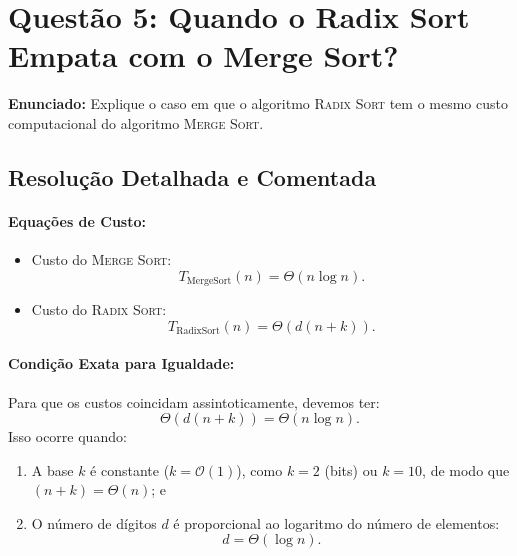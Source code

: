 \documentclass[11pt,a4paper]{article}
\begin{document}
\section*{Questão 5: Quando o Radix Sort Empata com o Merge Sort?}

\textbf{Enunciado:} Explique o caso em que o algoritmo \textsc{Radix Sort} tem o mesmo custo computacional do algoritmo \textsc{Merge Sort}.

\subsection*{Resolução Detalhada e Comentada}

\paragraph{Equações de Custo:}
\begin{itemize}
    \item Custo do \textsc{Merge Sort}:
    \[
        T_{\text{MergeSort}}(n) = \Theta(n \log n).
    \]
    \item Custo do \textsc{Radix Sort}:
    \[
        T_{\text{RadixSort}}(n) = \Theta(d(n + k)).
    \]
\end{itemize}

\paragraph{Condição Exata para Igualdade:}
Para que os custos coincidam assintoticamente, devemos ter:
\[
    \Theta(d(n + k)) = \Theta(n \log n).
\]
Isso ocorre quando:
\begin{enumerate}
    \item A base $k$ é constante ($k = \mathcal{O}(1)$), como $k = 2$ (bits) ou $k = 10$, de modo que $(n + k) = \Theta(n)$; e
    \item O número de dígitos $d$ é proporcional ao logaritmo do número de elementos:
    \[
        d = \Theta(\log n).
    \]
\end{enumerate}
\end{document}
